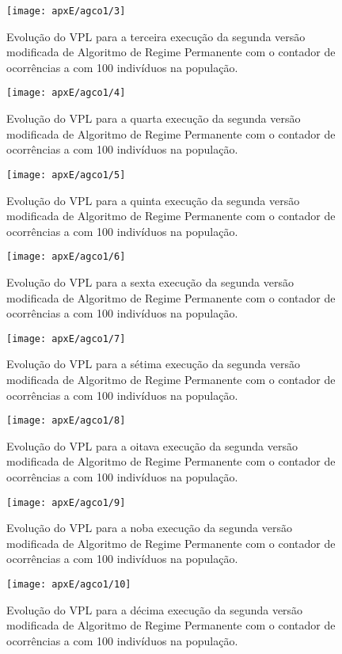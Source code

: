 \begin{figure}[H]
\centering

\texttt{[image: apxE/agco1/3]}
\caption{Evolução do VPL para a terceira execução da segunda versão modificada de Algoritmo de Regime Permanente com o contador de ocorrências a com 100 indivíduos na população.}
\label{fig:graphCO-03}
\end{figure}
\begin{figure}[H]
\centering

\texttt{[image: apxE/agco1/4]}
\caption{Evolução do VPL para a quarta execução da segunda versão modificada de Algoritmo de Regime Permanente com o contador de ocorrências a com 100 indivíduos na população.}
\label{fig:graphCO-04}
\end{figure}
\begin{figure}[H]
\centering

\texttt{[image: apxE/agco1/5]}
\caption{Evolução do VPL para a quinta execução da segunda versão modificada de Algoritmo de Regime Permanente com o contador de ocorrências a com 100 indivíduos na população.}
\label{fig:graphCO-05}
\end{figure}
\begin{figure}[H]
\centering

\texttt{[image: apxE/agco1/6]}
\caption{Evolução do VPL para a sexta execução da segunda versão modificada de Algoritmo de Regime Permanente com o contador de ocorrências a com 100 indivíduos na população.}
\label{fig:graphCO-06}
\end{figure}
\begin{figure}[H]
\centering

\texttt{[image: apxE/agco1/7]}
\caption{Evolução do VPL para a sétima execução da segunda versão modificada de Algoritmo de Regime Permanente com o contador de ocorrências a com 100 indivíduos na população.}
\label{fig:graphCO-07}
\end{figure}
\begin{figure}[H]
\centering

\texttt{[image: apxE/agco1/8]}
\caption{Evolução do VPL para a oitava execução da segunda versão modificada de Algoritmo de Regime Permanente com o contador de ocorrências a com 100 indivíduos na população.}
\label{fig:graphCO-08}
\end{figure}
\begin{figure}[H]
\centering

\texttt{[image: apxE/agco1/9]}
\caption{Evolução do VPL para a noba execução da segunda versão modificada de Algoritmo de Regime Permanente com o contador de ocorrências a com 100 indivíduos na população.}
\label{fig:graphCO-09}
\end{figure}
\begin{figure}[H]
\centering
\texttt{[image: apxE/agco1/10]}
\caption{Evolução do VPL para a décima execução da segunda versão modificada de Algoritmo de Regime Permanente com o contador de ocorrências a com 100 indivíduos na população.}
\label{fig:graphCO-10}
\end{figure}

